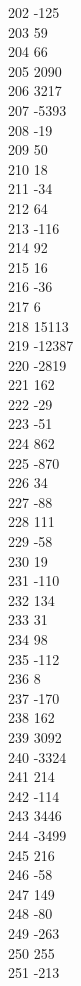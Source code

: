 { 202	-125 \\
 203	59 \\
 204	66 \\
 205	2090 \\
 206	3217 \\
 207	-5393 \\
 208	-19 \\
 209	50 \\
 210	18 \\
 211	-34 \\
 212	64 \\
 213	-116 \\
 214	92 \\
 215	16 \\
 216	-36 \\
 217	6 \\
 218	15113 \\
 219	-12387 \\
 220	-2819 \\
 221	162 \\
 222	-29 \\
 223	-51 \\
 224	862 \\
 225	-870 \\
 226	34 \\
 227	-88 \\
 228	111 \\
 229	-58 \\
 230	19 \\
 231	-110 \\
 232	134 \\
 233	31 \\
 234	98 \\
 235	-112 \\
 236	8 \\
 237	-170 \\
 238	162 \\
 239	3092 \\
 240	-3324 \\
 241	214 \\
 242	-114 \\
 243	3446 \\
 244	-3499 \\
 245	216 \\
 246	-58 \\
 247	149 \\
 248	-80 \\
 249	-263 \\
 250	255 \\
 251	-213 \\
}
